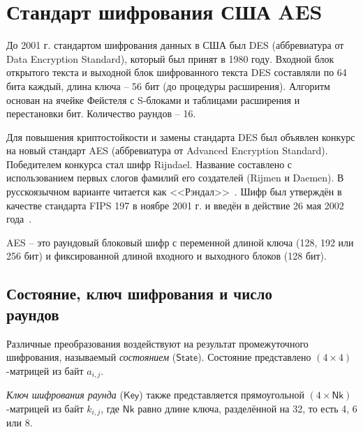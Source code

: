 \section{Стандарт шифрования США AES}

До 2001 г. стандартом шифрования данных в США был DES (аббревиатура от Data Encryption Standard), который был принят в 1980 году. Входной блок открытого текста и выходной блок шифрованного текста DES составляли по 64 бита каждый, длина ключа -- 56 бит (до процедуры расширения). Алгоритм основан на ячейке Фейстеля с S-блоками и таблицами расширения и перестановки бит. Количество раундов -- 16.

Для повышения криптостойкости и замены стандарта DES был объявлен конкурс на новый стандарт AES (аббревиатура от Advanced Encryption Standard). Победителем конкурса стал шифр Rijndael. Название составлено с использованием первых слогов фамилий его создателей (Rijmen и Daemen). В русскоязычном варианте читается как <<Рэндал>>~\cite{Kiwi:1999}. Шифр был утверждён в качестве стандарта FIPS 197 в ноябре 2001 г. и введён в действие 26 мая 2002 года~\cite{FIPS-PUB-197}.

AES -- это раундовый блоковый шифр с переменной длиной ключа (128, 192 или 256 бит) и фиксированной длиной входного и выходного блоков (128 бит).

\subsection[Состояние, ключ шифрования и число раундов]{Состояние, ключ шифрования и число \protect\\ раундов}

Различные преобразования воздействуют на результат промежуточного шифрования, называемый \textit{состоянием} ($\mathsf{State}$). Состояние представлено $(4 \times 4)$-матрицей из байт $a_{i,j}$.

\textit{Ключ шифрования раунда} ($\mathsf{Key}$) также представляется прямоугольной $(4 \times \mathsf{Nk})$-матрицей из байт $k_{i,j}$, где $\mathsf{Nk}$ равно длине ключа, разделённой на 32, то есть 4, 6 или 8.

